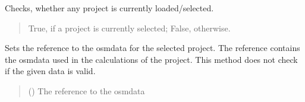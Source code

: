 \documentclass[letterpaper,10pt,english]{sphinxmanual}
\begin{document}
\begin{fulllineitems}
\begin{fulllineitems}
\begin{quote}
\begin{description}
\sphinxAtStartPar
{\hyperref[\detokenize{apidoc/src.osm_configurator.model.project:src.osm_configurator.model.project.config_phase_enum.ConfigPhase}]{}}

\end{description}\end{quote}

\end{fulllineitems}


\begin{fulllineitems}
\label{\detokenize{apidoc/src.osm_configurator.control:src.osm_configurator.control.control.Control.is_project_loaded}}
\pysigstartsignatures
{}
\pysigstopsignatures
\sphinxAtStartPar
Checks, whether any project is currently loaded/selected.
\begin{quote}\begin{description}
\sphinxAtStartPar
True, if a project is currently selected; False, otherwise.

\sphinxAtStartPar
{}

\end{description}\end{quote}

\end{fulllineitems}


\begin{fulllineitems}
\label{\detokenize{apidoc/src.osm_configurator.control:src.osm_configurator.control.control.Control.set_osm_data_reference}}
\pysigstartsignatures
{}
\pysigstopsignatures
\sphinxAtStartPar
Sets the reference to the osm\sphinxhyphen{}data for the selected project.
The reference contains the osm\sphinxhyphen{}data used in the calculations of the project. This method does not check if the given data is valid.
\begin{quote}\begin{description}
\sphinxAtStartPar
{} () \textendash{} The reference to the osm\sphinxhyphen{}data


\end{description}
\end{quote}
\end{fulllineitems}
\end{fulllineitems}
\end{document}

